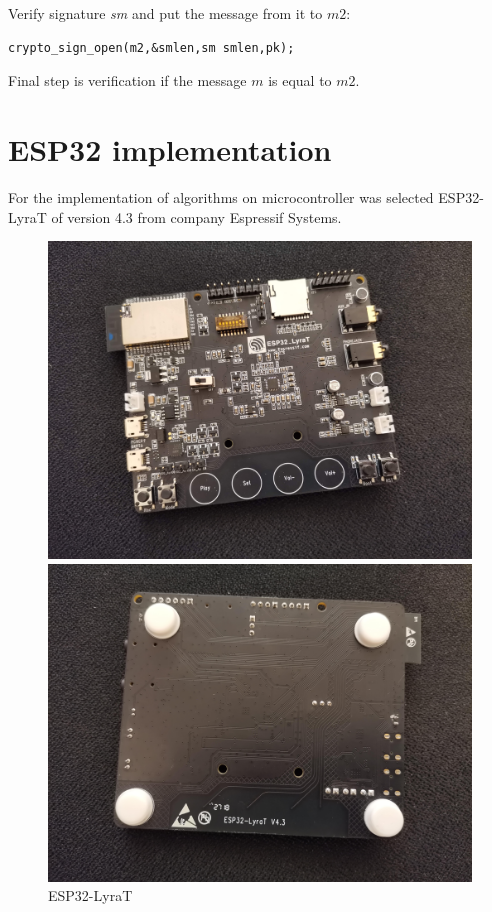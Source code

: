 \documentclass[thesis=M,english]{FITthesis}[2019/12/23]
\begin{document}
\bigskip
\noindent
Verify signature \textit{sm} and put the message from it to $m2$:
\begin{lstlisting}[frame=single]
crypto_sign_open(m2,&smlen,sm smlen,pk);
\end{lstlisting}

\bigskip
\noindent
Final step is verification if the message $m$ is equal to $m2$.

\newpage
\section{ESP32 implementation} \label{ESP32_impl}
For the implementation of algorithms on microcontroller was selected ESP32-LyraT of version 4.3 from company Espressif Systems.

\iftrue
\begin{figure}[H]
\centering
\begin{minipage}{.5\textwidth}
  \centering
  \includegraphics[width=1\linewidth]{images/ESP32-LyraT-1.jpg}
\end{minipage}%
\begin{minipage}{.5\textwidth}
  \centering
  \includegraphics[width=1\linewidth]{images/ESP32-LyraT-2.jpg}
\end{minipage}
\caption{ESP32-LyraT}
\label{esp32-lyrat}
\end{figure}
\fi
\end{document}
